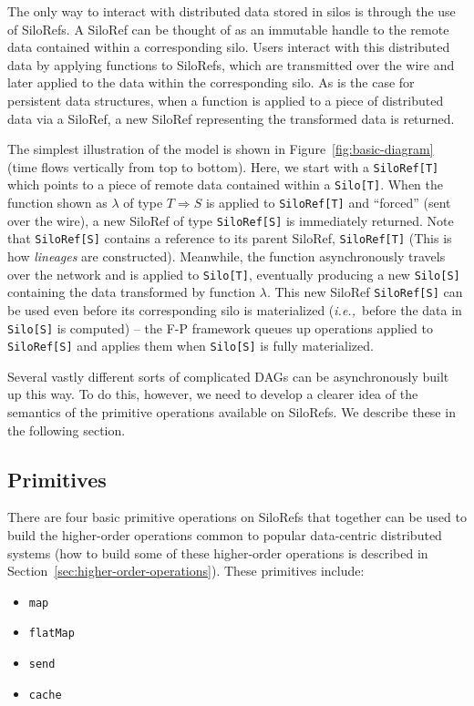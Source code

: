 \documentclass[preprint]{sigplanconf}
\theoremstyle{definition}
\theoremstyle{definition}
\newcommand{\ie}{{\em i.e.,~}}
\begin{document}
The only way to interact with distributed data stored in silos is through the
use of SiloRefs. A SiloRef can be thought of as an immutable handle to the
remote data contained within a corresponding silo. Users interact with this
distributed data by applying functions to SiloRefs, which are transmitted over
the wire and later applied to the data within the corresponding silo. As is
the case for persistent data structures, when a function is applied to a piece
of distributed data via a SiloRef, a new SiloRef representing the transformed
data is returned.

The simplest illustration of the model is shown in Figure~\ref{fig:basic-diagram}
(time flows vertically from top to bottom). Here, we start with a
\verb|SiloRef[T]| which points to a piece of remote data contained within a
\verb|Silo[T]|. When the function shown as $\lambda$ of type $T \Rightarrow S$
is applied to \verb|SiloRef[T]| and ``forced'' (sent over the wire), a new
SiloRef of type \verb|SiloRef[S]| is immediately returned. Note that
\verb|SiloRef[S]| contains a reference to its parent SiloRef,
\verb|SiloRef[T]| (This is how {\em lineages} are constructed). Meanwhile, the
function asynchronously travels over the network and is applied to
\verb|Silo[T]|, eventually producing a new \verb|Silo[S]| containing the data
transformed by function $\lambda$. This new SiloRef \verb|SiloRef[S]| can be
used even before its corresponding silo is materialized (\ie before the data
in \verb|Silo[S]| is computed) – the F-P framework queues up operations
applied to \verb|SiloRef[S]| and applies them when \verb|Silo[S]| is fully
materialized.

Several vastly different sorts of complicated DAGs can be asynchronously built
up this way. To do this, however, we need to develop a clearer idea of the
semantics of the primitive operations available on SiloRefs. We describe these
in the following section.


\subsection{Primitives}
\label{sec:primitives}

There are four basic primitive operations on SiloRefs that together can be
used to build the higher-order operations common to popular data-centric
distributed systems (how to build some of these higher-order operations is
described in Section~\ref{sec:higher-order-operations}). These primitives
include:

\begin{itemize}[noitemsep,nolistsep]
\item \verb|map|
\item \verb|flatMap|
\item \verb|send|
\item \verb|cache|
\end{itemize}
\end{document}

